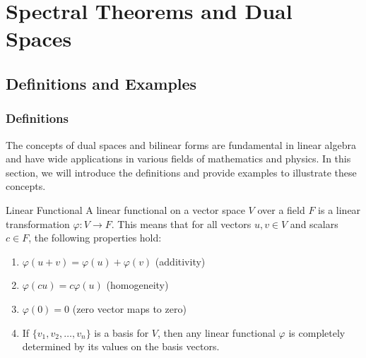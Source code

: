 \documentclass[openany]{book}
\begin{document}
\chapter{Spectral Theorems and Dual Spaces}
\section{Definitions and Examples}
\subsection{Definitions}
The concepts of dual spaces and bilinear forms are fundamental in linear algebra and have wide applications in various fields of mathematics and physics. In this section, we will introduce the definitions and provide examples to illustrate these concepts. \\ 
\begin{mydefinition}{Linear Functional}
A linear functional on a vector space $V$ over a field $F$ is a linear transformation $\varphi: V \to F$. This means that for all vectors $u, v \in V$ and scalars $c \in F$, the following properties hold:
\begin{enumerate}
    \item $\varphi(u + v) = \varphi(u) + \varphi(v)$ (additivity)
    \item $\varphi(cu) = c\varphi(u)$ (homogeneity)
    \item $\varphi(0) = 0$ (zero vector maps to zero)
    \item If $\{v_1, v_2, \ldots, v_n\}$ is a basis for $V$, then any linear functional $\varphi$ is completely determined by its values on the basis vectors.
\end{enumerate}
\end{mydefinition}
\end{document}
